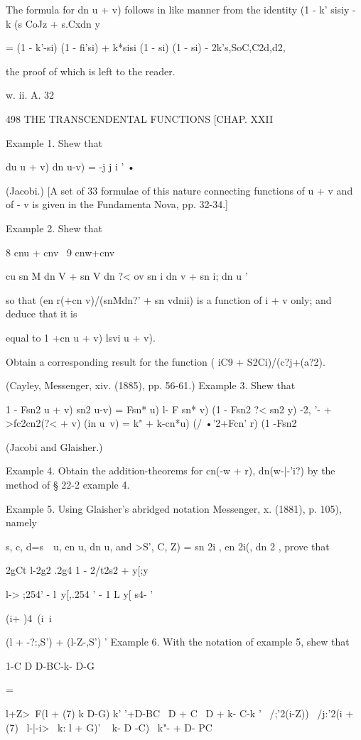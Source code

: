 The formula for dn u + v) follows in like manner from the identity (1
- k' sisiy - k (s CoJz + s.Cxdn y

= (1 - k'-si) (1 - fi'si) + k*sisi (1 - si) (1 - si) -
2k's,SoC,C2d,d2,

the proof of which is left to the reader.

w. ii. A. 32

498 THE TRANSCENDENTAL FUNCTIONS [CHAP. XXII

Example 1. Shew that

du u + v) dn u-v) = -j j i ' •

(Jacobi.) [A set of 33 formulae of this nature connecting functions of
u + v and of - v is given in the Fundamenta Nova, pp. 32-34.]

Example 2. Shew that

8 cnu + cnv \ 9 cnw+cnv

cu sn M dn V + sn V dn ?< ov sn i dn v + sn i; dn u '

so that (en r(+cn v)/(snMdn?' + sn vdnii) is a function of i + v only;
and deduce that it is

equal to 1 +cn u + v) lsvi u + v).

Obtain a corresponding result for the function ( iC9 +
S2Ci)/(c?j+(a?2).

(Cayley, Messenger, xiv. (1885), pp. 56-61.) Example 3. Shew that

1 - Fsn2 u + v) sn2 u-v) = Fsn* u) l- F sn* v) (1 - Fsn2 ?< sn2 y) -2,
'- + >fc2cn2(?< + v) (in u~v) = k" + k-cn*u) (/ •'2+Fcn' r) (1
-Fsn2%

(Jacobi and Glaisher.)

Example 4. Obtain the addition-theorems for cn(-w + r), dn(w-|-'i?) by
the method of § 22-2 example 4.

Example 5. Using Glaisher's abridged notation Messenger, x. (1881), p.
105), namely

s, c, d=s\ \ u, en u, dn u, and >S', C, Z) = sn 2i , en 2i(, dn 2 ,
prove that

2gCt l-2g2 .2g4 1 - 2/t2s2 + y[;y

l-> ;254' - l\ y[,.254 ' - 1 L y[ s4- '

(i+ )4\ (i\ i

(l + -?:,S') + (l-Z-,S') ' Example 6. With the notation of example 5,
shew that

1-C D D-BC-k- D-G

   =

l+Z>~F(l + (7) k D-G) k' '+D-BC \ D + C \ D + k- C-k ' \ /;'2(i-Z)) \
/j:'2(i + (7) ~l-|-i>~ k: l + G)' ~ k- D -C)~ k"- + D- PC

